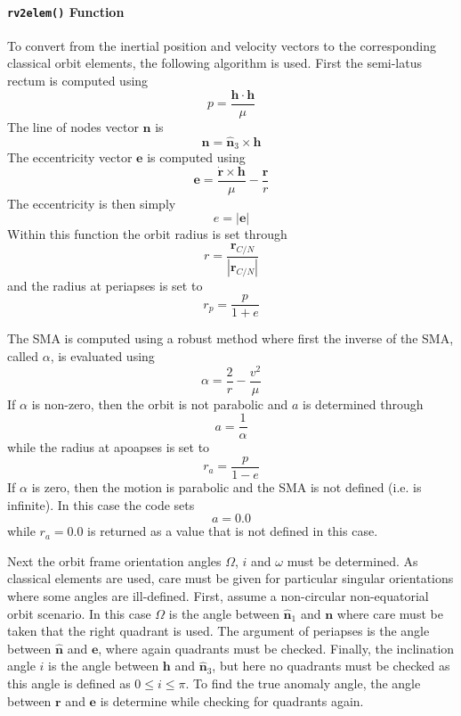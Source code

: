 \paragraph{{\tt rv2elem()} Function}
To convert from the inertial position and velocity vectors to the corresponding classical orbit elements, the following algorithm is used.  First the semi-latus rectum is computed using
\begin{equation}
	p = \frac{\bm h \cdot \bm h}{\mu}
\end{equation}
The line of nodes vector $\bm n$ is 
\begin{equation}
	\bm n = \hat{\bm n}_{3} \times \bm h
\end{equation}
The eccentricity vector $\bm e$ is computed using\cite{schaub}
\begin{equation}
	\bm e = \frac{\dot{\bm r} \times \bm h}{\mu} - \frac{\bm r}{r}
\end{equation}
The eccentricity is then simply
\begin{equation}
	e = |\bm e|
\end{equation}
Within this function the orbit radius is set through
\begin{equation}
	r = \frac{\bm r_{C/N}}{ | \bm r_{C/N}|}
\end{equation}
and the radius at periapses is set to
\begin{equation}
	r_{p} = \frac{p}{1 + e}
\end{equation}

The SMA is computed using a robust method where first the inverse of the SMA, called $\alpha$, is evaluated using\cite{schaub}
\begin{equation}
	\alpha = \frac{2}{r} - \frac{v^{2}}{\mu}
\end{equation}
If $\alpha$ is non-zero, then the orbit is not parabolic and $a$ is determined through
\begin{equation}
	a = \frac{1}{\alpha}
\end{equation}
while the radius at apoapses is set to
\begin{equation}
	r_{a} = \frac{p}{1 - e}
\end{equation}
If $\alpha$ is zero, then the motion is parabolic and the SMA is not defined (i.e. is infinite).  In this case the code sets 
$$
	a = 0.0
$$
while $r_{a} = 0.0$ is returned as a value that is not defined in this case.


Next the orbit frame orientation angles $\Omega$, $i$ and $\omega$ must be determined.  As classical elements are used, care must be given for particular singular orientations where some angles are ill-defined.  First, assume a non-circular non-equatorial orbit scenario.  In this case $\Omega$ is the angle between $\hat{\bm n}_{1}$ and $\bm n$ where care must be taken that the right quadrant is used.  The argument of periapses is the angle between $\hat{\bm n}$ and $\bm e$, where again quadrants must be checked.  Finally, the inclination angle $i$ is the angle between $\bm h$ and $\hat{\bm n}_{3}$, but here no quadrants must be checked as this angle is defined as $0 \le i \le \pi$.  To find the true anomaly angle, the angle between $\bm r$ and $\bm e$ is determine while checking for quadrants again.

